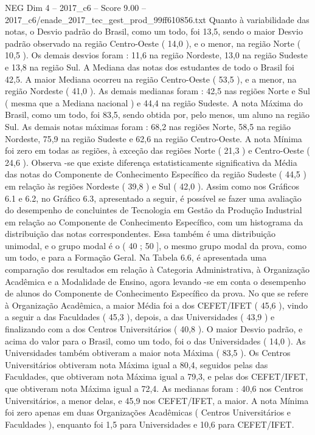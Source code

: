 \begin{textsample}{NEG Dim 4 – 2017\_c6 – Score 9.00 – 2017\_c6/enade\_2017\_tec\_gest\_prod\_99ff610856.txt}
Quanto à variabilidade das notas, o Desvio padrão do Brasil, como um todo, foi 13,5, sendo o maior Desvio padrão observado na região Centro-Oeste ( 14,0 ), e o menor, na região Norte ( 10,5 ).
Os demais desvios foram : 11,6 na região Nordeste, 13,0 na região Sudeste e 13,8 na região Sul.
A Mediana das notas dos estudantes de todo o Brasil foi 42,5.
A maior Mediana ocorreu na região Centro-Oeste ( 53,5 ), e a menor, na região Nordeste ( 41,0 ).
As demais medianas foram : 42,5 nas regiões Norte e Sul ( mesma que a Mediana nacional ) e 44,4 na região Sudeste.
A nota Máxima do Brasil, como um todo, foi 83,5, sendo obtida por, pelo menos, um aluno na região Sul.
As demais notas máximas foram : 68,2 nas regiões Norte, 58,5 na região Nordeste, 75,9 na região Sudeste e 62,6 na região Centro-Oeste.
A nota Mínima foi zero em todas as regiões, à exceção das regiões Norte ( 21,3 ) e Centro-Oeste ( 24,6 ).
Observa -se que existe diferença estatisticamente significativa da Média das notas do Componente de Conhecimento Específico da região Sudeste ( 44,5 ) em relação às regiões Nordeste ( 39,8 ) e Sul ( 42,0 ).
Assim como nos Gráficos 6.1 e 6.2, no Gráfico 6.3, apresentado a seguir, é possível se fazer uma avaliação do desempenho de concluintes de Tecnologia em Gestão da Produção Industrial em relação ao Componente de Conhecimento Específico, com um histograma da distribuição das notas correspondentes.
Essa também é uma distribuição unimodal, e o grupo modal é o ( 40 ; 50 ], o mesmo grupo modal da prova, como um todo, e para a Formação Geral.
Na Tabela 6.6, é apresentada uma comparação dos resultados em relação à Categoria Administrativa, à Organização Acadêmica e a Modalidade de Ensino, agora levando -se em conta o desempenho de alunos do Componente de Conhecimento Específico da prova.
No que se refere à Organização Acadêmica, a maior Média foi a dos CEFET/IFET ( 45,6 ), vindo a seguir a das Faculdades ( 45,3 ), depois, a das Universidades ( 43,9 ) e finalizando com a dos Centros Universitários ( 40,8 ).
O maior Desvio padrão, e acima do valor para o Brasil, como um todo, foi o das Universidades ( 14,0 ).
As Universidades também obtiveram a maior nota Máxima ( 83,5 ).
Os Centros Universitários obtiveram nota Máxima igual a 80,4, seguidos pelas das Faculdades, que obtiveram nota Máxima igual a 79,3, e pelas dos CEFET/IFET, que obtiveram nota Máxima igual a 72,4.
As medianas foram : 40,6 nos Centros Universitários, a menor delas, e 45,9 nos CEFET/IFET, a maior.
A nota Mínima foi zero apenas em duas Organizações Acadêmicas ( Centros Universitários e Faculdades ), enquanto foi 1,5 para Universidades e 10,6 para CEFET/IFET.

\end{textsample}
